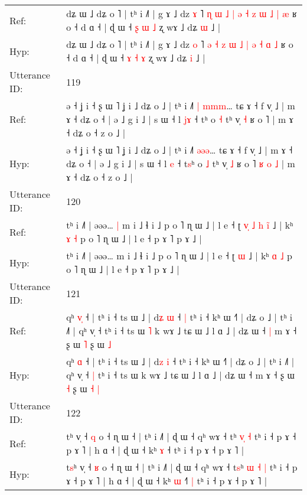 \documentclass[10pt]{article}
\DeclareRobustCommand{\hl}[1]{{\textcolor{red}{#1}}}
\begin{document}
\begin{longtable}{ll}
Ref: & dʑ ɯ ˩ dʑ o ˥ | tʰ i ˩˥ | g ɤ ˩ dz \hl{ɤ} ˥\hl{ }\hl{ɳ} \hl{ɯ} \hl{˩} \hl{|} \hl{ə} \hl{˧} \hl{z} \hl{ɯ} \hl{˩} \hl{|} \hl{æ} ʁ o ˧ d ɑ ˧ | ɖ ɯ ˧ \hl{ʂ} \hl{ɯ} \hl{˩} ʐ wɤ ˩ dʑ \hl{ɯ} ˩ |
 \\
Hyp: & dʑ ɯ ˩ dʑ o ˥ | tʰ i ˩˥ | g ɤ ˩ dz \hl{o} ˥\hl{}\hl{} \hl{ə} \hl{˧} \hl{z} \hl{ɯ} \hl{˩} \hl{|} \hl{ə} \hl{˧} \hl{ɑ} \hl{˩} ʁ o ˧ d ɑ ˧ | ɖ ɯ ˧ \hl{ɤ} \hl{˧} \hl{ɤ} ʐ wɤ ˩ dʑ \hl{i} ˩ |
 \\
\midrule
Utterance ID: & 119 \\
Ref: & ə ˧ ʝ i ˧ ʂ ɯ ˥ ʝ i ˩ dʑ o ˩ | tʰ i ˩˥\hl{ }\hl{|} \hl{m}\hl{m}\hl{m}… tɕ ɤ ˧ f v̩ ˩ | m ɤ ˧ dʑ o ˧ | ə ˩ g i ˩ | s ɯ ˧ l \hl{j}\hl{ɤ} ˧ t\hl{}ʰ o \hl{˧} tʰ v̩ \hl{˧} ʁ o ˥\hl{}\hl{}\hl{}\hl{}\hl{}\hl{} | m ɤ ˧ dʑ o ˧ z o ˩ |
 \\
Hyp: & ə ˧ ʝ i ˧ ʂ ɯ ˥ ʝ i ˩ dʑ o ˩ | tʰ i ˩˥\hl{}\hl{} \hl{ə}\hl{ə}\hl{ə}… tɕ ɤ ˧ f v̩ ˩ | m ɤ ˧ dʑ o ˧ | ə ˩ g i ˩ | s ɯ ˧ l \hl{}\hl{e} ˧ t\hl{s}ʰ o \hl{˩} tʰ v̩ \hl{˩} ʁ o ˥\hl{ }\hl{ʁ}\hl{ }\hl{o}\hl{ }\hl{˩} | m ɤ ˧ dʑ o ˧ z o ˩ |
 \\
\midrule
Utterance ID: & 120 \\
Ref: & tʰ i ˩˥ | əəə…\hl{ }\hl{|} m i ˩ ɬ i ˩ p o ˥ ɳ ɯ ˩ | l e ˧ ʈ\hl{ }\hl{v}\hl{̩}\hl{ }\hl{˩}\hl{ }\hl{h} \hl{i}\hl{̃} ˩ | kʰ \hl{ɤ} \hl{˧} p o ˥ ɳ ɯ ˩ | l e ˧ p ɤ ˥ p ɤ ˩ |
 \\
Hyp: & tʰ i ˩˥ | əəə…\hl{}\hl{} m i ˩ ɬ i ˩ p o ˥ ɳ ɯ ˩ | l e ˧ ʈ\hl{}\hl{}\hl{}\hl{}\hl{}\hl{}\hl{} \hl{}\hl{ɯ} ˩ | kʰ \hl{ɑ} \hl{˩} p o ˥ ɳ ɯ ˩ | l e ˧ p ɤ ˥ p ɤ ˩ |
 \\
\midrule
Utterance ID: & 121 \\
Ref: & qʰ \hl{v}\hl{̩} ˧ | tʰ i ˧ ts ɯ ˩ | d\hl{ʑ} \hl{ɯ} ˧\hl{ }\hl{|} tʰ i ˧ kʰ ɯ ˧˥ | dʑ o ˩ | tʰ i ˩˥ | qʰ v̩ ˧\hl{}\hl{} tʰ i ˧ ts ɯ\hl{ }\hl{˥} k wɤ ˩ tɕ ɯ ˩ l ɑ ˩ | dʑ ɯ ˧\hl{ }\hl{|} m ɤ ˧ ʂ ɯ \hl{˥} ʂ ɯ\hl{}\hl{} \hl{˩}
 \\
Hyp: & qʰ \hl{}\hl{ɑ} ˧ | tʰ i ˧ ts ɯ ˩ | d\hl{z} \hl{i} ˧\hl{}\hl{} tʰ i ˧ kʰ ɯ ˧˥ | dʑ o ˩ | tʰ i ˩˥ | qʰ v̩ ˧\hl{ }\hl{|} tʰ i ˧ ts ɯ\hl{}\hl{} k wɤ ˩ tɕ ɯ ˩ l ɑ ˩ | dʑ ɯ ˧\hl{}\hl{} m ɤ ˧ ʂ ɯ \hl{˧} ʂ ɯ\hl{ }\hl{˧} \hl{|}
 \\
\midrule
Utterance ID: & 122 \\
Ref: & t\hl{}ʰ v̩ ˧ \hl{q} o ˧ ɳ ɯ ˧ | tʰ i ˩˥ | ɖ ɯ ˧ qʰ wɤ ˧ t\hl{}ʰ \hl{}\hl{v}\hl{̩} \hl{˧} tʰ i ˧ p ɤ ˧ p ɤ ˥ | h ɑ ˧ | ɖ ɯ ˧ kʰ \hl{ɤ} ˧\hl{}\hl{}\hl{} tʰ i ˧ p ɤ ˧ p ɤ ˥ |
 \\
Hyp: & t\hl{s}ʰ v̩ ˧ \hl{ʁ} o ˧ ɳ ɯ ˧ | tʰ i ˩˥ | ɖ ɯ ˧ qʰ wɤ ˧ t\hl{s}ʰ \hl{ɯ}\hl{ }\hl{˧} \hl{|} tʰ i ˧ p ɤ ˧ p ɤ ˥ | h ɑ ˧ | ɖ ɯ ˧ kʰ \hl{ɯ} ˧\hl{˥}\hl{ }\hl{|} tʰ i ˧ p ɤ ˧ p ɤ ˥ |

\end{longtable}
\end{document}
